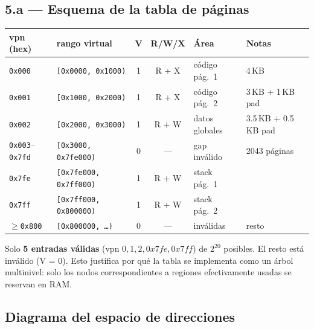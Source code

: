 \documentclass[11pt,a4paper]{article}
\begin{document}
\subsection*{5.a --- Esquema de la tabla de páginas}

\begin{center}
\footnotesize
\begin{tabular}{@{}llccp{2.5cm}p{3cm}@{}}
\toprule
vpn (hex)    & rango virtual               & V & R/W/X & Área              & Notas \\
\midrule
\texttt{0x000} & \texttt{[0x0000, 0x1000)} & 1 & R + X & código pág.\ 1    & 4\,KB \\
\texttt{0x001} & \texttt{[0x1000, 0x2000)} & 1 & R + X & código pág.\ 2    & 3\,KB + 1\,KB pad \\
\texttt{0x002} & \texttt{[0x2000, 0x3000)} & 1 & R + W & datos globales    & 3.5\,KB + 0.5\,KB pad \\
\texttt{0x003}--\texttt{0x7fd} & \texttt{[0x3000, 0x7fe000)} & 0 & --- & gap inválido & 2043 páginas \\
\texttt{0x7fe} & \texttt{[0x7fe000, 0x7ff000)} & 1 & R + W & stack pág.\ 1     & \\
\texttt{0x7ff} & \texttt{[0x7ff000, 0x800000)} & 1 & R + W & stack pág.\ 2     & \\
$\geq$\texttt{0x800} & \texttt{[0x800000, \ldots)} & 0 & --- & inválidas         & resto \\
\bottomrule
\end{tabular}
\end{center}

Solo \textbf{5 entradas válidas} (vpn $0, 1, 2, 0x7fe, 0x7ff$) de
$2^{20}$ posibles. El resto está inválido (V = 0). Esto justifica
por qué la tabla se implementa como un árbol multinivel: solo los
nodos correspondientes a regiones efectivamente usadas se reservan
en RAM.

\subsection*{Diagrama del espacio de direcciones}
\end{document}
